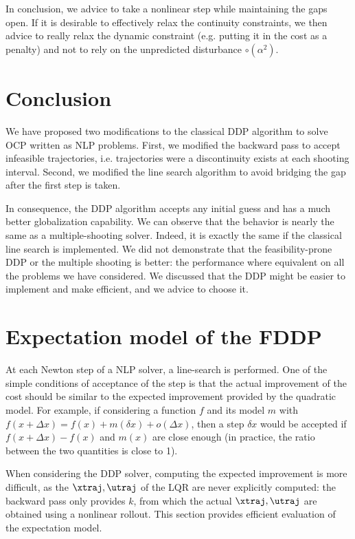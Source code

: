 \documentclass[10pt,a4paper]{article}
\begin{document}
In conclusion, we advice to take a nonlinear step while maintaining the gaps open.
If it is desirable to effectively relax the continuity constraints, we then advice to really relax the dynamic constraint (e.g. putting it in the cost as a penalty) and not to rely on the unpredicted disturbance $\circ(\alpha^2)$.

\section{Conclusion}

We have proposed two modifications to the classical DDP algorithm to solve OCP written as NLP problems.
First, we modified the backward pass to accept infeasible trajectories, i.e. trajectories were a discontinuity exists at each shooting interval.
Second, we modified the line search algorithm to avoid bridging the gap after the first step is taken.

In consequence, the DDP algorithm accepts any initial guess and has a much better globalization capability.
We can observe that the behavior is nearly the same as a multiple-shooting solver.
Indeed, it is exactly the same if the classical line search is implemented.
We did not demonstrate that the feasibility-prone DDP or the multiple shooting is better: the performance where equivalent on all the problems we have considered.
We discussed that the DDP might be easier to implement and make efficient, and we advice to choose it.

\section{Expectation model of the FDDP}

At each Newton step of a NLP solver, a line-search is performed.
One of the simple conditions of acceptance of the step is that the actual improvement of the cost should be similar to the expected improvement provided by the quadratic model.
For example, if considering a function $f$ and its model $m$ with $f(x+\Delta x) = f(x) + m(\delta x) + o(\Delta x)$, then a step $\delta x$ would be accepted if $f(x+\Delta x)-f(x)$ and $m(x)$ are close enough (in practice, the ratio between the two quantities is close to 1).

When considering the DDP solver, computing the expected improvement is more difficult, as the $\xtraj,\utraj$ of the LQR are never explicitly computed: the backward pass only provides $k$, from which the actual $\xtraj,\utraj$ are obtained using a nonlinear rollout.
This section provides efficient evaluation of the expectation model.
\end{document}

